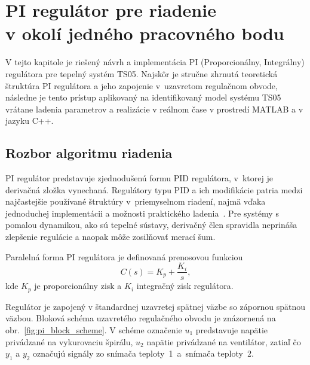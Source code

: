 
\section[PI regulátor pre riadenie v okolí jedného pracovného bodu]{PI regulátor pre riadenie\\v okolí jedného pracovného bodu}
\label{sec:pi_controller}

V tejto kapitole je riešený návrh a implementácia PI (Proporcionálny, Integrálny) regulátora pre tepelný systém TS05.
Najskôr je stručne zhrnutá teoretická štruktúra PI regulátora a jeho zapojenie
v~uzavretom regulačnom obvode, následne je tento prístup aplikovaný na
identifikovaný model systému TS05 vrátane ladenia parametrov a realizácie
v reálnom čase v prostredí MATLAB a v jazyku C++.

\subsection{Rozbor algoritmu riadenia}

PI regulátor predstavuje zjednodušenú formu PID regulátora,
v~ktorej je derivačná zložka vynechaná.
Regulátory typu PID a ich modifikácie patria medzi najčastejšie používané
štruktúry v~priemyselnom riadení, najmä vďaka jednoduchej implementácii
a možnosti praktického ladenia~\cite{wang2020,astrom1995}.
Pre systémy s pomalou dynamikou, ako sú tepelné sústavy,
derivačný člen spravidla neprináša zlepšenie regulácie
a naopak môže zosilňovať merací šum.

Paralelná forma PI regulátora je definovaná prenosovou funkciou
\begin{equation}
	C(s) = K_p + \frac{K_i}{s},
	\label{eq:pi_parallel}
\end{equation}
kde $K_p$ je proporcionálny zisk a $K_i$ integračný zisk regulátora.

Regulátor je zapojený v štandardnej uzavretej spätnej väzbe
so zápornou spätnou väzbou.
Bloková schéma uzavretého regulačného obvodu je znázornená
na obr.~\ref{fig:pi_block_scheme}. V schéme označenie $u_1$ predstavuje napätie privádzané na vykurovaciu špirálu,
$u_2$ napätie privádzané na ventilátor, zatiaľ čo $y_1$ a $y_2$ označujú
signály zo snímača teploty~1~a~snímača teploty~2.

